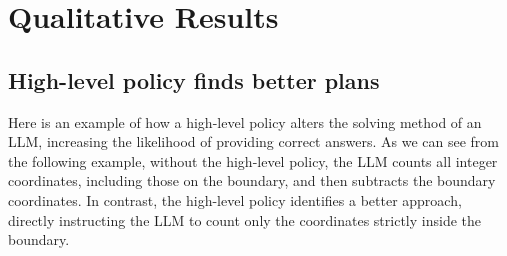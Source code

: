 \section{Qualitative Results}
\label{app:qualitative_results}

\subsection{High-level policy finds better plans}
\label{app:qualitative_results.high_level_better}
Here is an example of how a high-level policy alters the solving method of an LLM, increasing the likelihood of providing correct answers. 
As we can see from the following example, without the high-level policy, the LLM counts all integer coordinates, including those on the boundary, and then subtracts the boundary coordinates. In contrast, the high-level policy identifies a better approach, directly instructing the LLM to count only the coordinates strictly inside the boundary.


